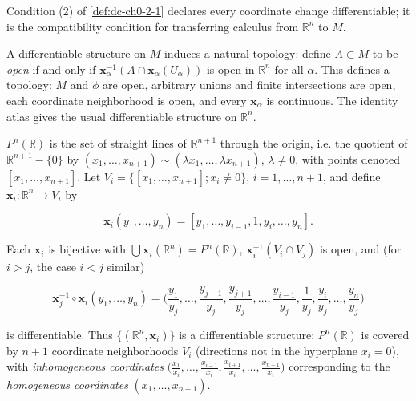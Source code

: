 \begin{remark}
  \label{rem:dc-ch0-2-2}
  \notready
  Condition (2) of \cref{def:dc-ch0-2-1} declares every coordinate change
  differentiable; it is the
  compatibility condition for transferring calculus from $\mathbb{R}^n$ to $M$.
\end{remark}

\begin{remark}
  \label{rem:dc-ch0-2-3}
  \notready
  A differentiable structure on $M$ induces a natural topology: define $A\subset M$
  to be \emph{open} if and only if $\mathbf{x}_\alpha^{-1}(A\cap\mathbf{x}_\alpha(U_\alpha))$
  is open in $\mathbb{R}^n$ for all $\alpha$. This defines a topology: $M$ and $\phi$
  are open, arbitrary unions and finite intersections are open, each coordinate
  neighborhood is open, and every $\mathbf{x}_\alpha$ is continuous. The identity
  atlas gives the usual differentiable structure on $\mathbb{R}^n$.
\end{remark}

\begin{example}
  \label{ex:dc-ch0-2-4}
  \notready
  $P^n(\mathbb{R})$ is the set of straight lines of $\mathbb{R}^{n+1}$ through the
  origin, i.e. the quotient of $\mathbb{R}^{n+1}-\{0\}$ by
  $(x_1,\dots,x_{n+1})\sim(\lambda x_1,\dots,\lambda x_{n+1})$, $\lambda\neq0$,
  with points denoted $[x_1,\dots,x_{n+1}]$. Let
  $V_i=\{[x_1,\dots,x_{n+1}]; x_i\neq0\}$, $i=1,\dots,n+1$, and define
  $\mathbf{x}_i:\mathbb{R}^n\to V_i$ by
  
  $$
  \mathbf{x}_i(y_1,\dots,y_n)=[y_1,\dots,y_{i-1},1,y_i,\dots,y_n].
  $$
  
  Each $\mathbf{x}_i$ is bijective with $\bigcup\mathbf{x}_i(\mathbb{R}^n)=P^n(\mathbb{R})$,
  $\mathbf{x}_i^{-1}(V_i\cap V_j)$ is open, and (for $i>j$, the case $i<j$ similar)
  
  $$
  \mathbf{x}_j^{-1}\circ\mathbf{x}_i(y_1,\dots,y_n)=\Big(\frac{y_1}{y_j},\dots,\frac{y_{j-1}}{y_j},\frac{y_{j+1}}{y_j},\dots,\frac{y_{i-1}}{y_j},\frac{1}{y_j},\frac{y_i}{y_j},\dots,\frac{y_n}{y_j}\Big)
  $$
  
  is differentiable. Thus $\{(\mathbb{R}^n,\mathbf{x}_i)\}$ is a differentiable
  structure: $P^n(\mathbb{R})$ is covered by $n+1$ coordinate neighborhoods $V_i$
  (directions not in the hyperplane $x_i=0$), with \emph{inhomogeneous coordinates}
  $\big(\frac{x_1}{x_i},\dots,\frac{x_{i-1}}{x_i},\frac{x_{i+1}}{x_i},\dots,\frac{x_{n+1}}{x_i}\big)$
  corresponding to the \emph{homogeneous coordinates} $(x_1,\dots,x_{n+1})$.
\end{example}

